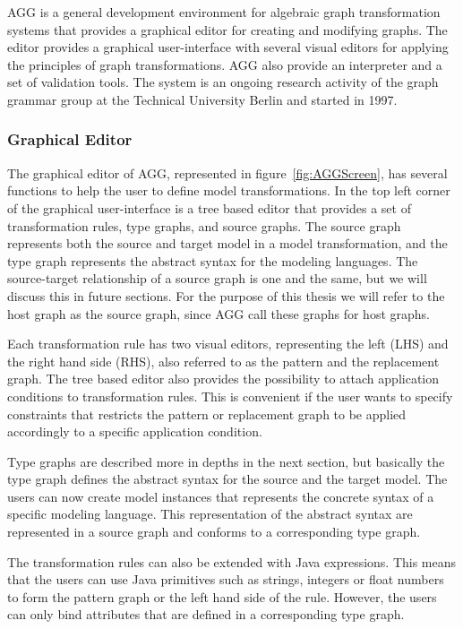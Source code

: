 AGG is a general development environment for algebraic graph
transformation systems that provides a graphical editor for creating
and modifying graphs. The editor provides a graphical user-interface with
several visual editors for applying the principles of graph transformations. AGG
also provide an interpreter and a set of validation tools. The system is an
ongoing research activity of the graph grammar group at the Technical University
Berlin and started in 1997.

\subsubsection*{Graphical Editor}
The graphical editor of AGG, represented in figure~\ref{fig:AGGScreen}, has
several functions to help the user to define model transformations. In the top
left corner of the graphical user-interface is a tree based editor that provides
a set of transformation rules, type graphs, and source graphs. The source graph
represents both the source and target model in a model transformation, and the
type graph represents the abstract syntax for the modeling languages. The
source-target relationship of a source graph is one and the same, but we will
discuss this in future sections. For the purpose of this thesis we will
refer to the host graph as the source graph, since AGG call these graphs for
host graphs.

Each transformation rule has two visual editors, representing the left
(LHS) and the right hand side (RHS), also referred to as the pattern and the
replacement graph. The tree based editor also provides the possibility to attach
application conditions to transformation rules. This is convenient if the user
wants to specify constraints that restricts the pattern or replacement graph to
be applied accordingly to a specific application condition.

Type graphs are described more in depths in the next section, but basically
the type graph defines the abstract syntax for the source and the target model.
The users can now create model instances that represents the concrete syntax of
a specific modeling language. This representation of the abstract syntax are
represented in a source graph and conforms to a corresponding type graph.

The transformation rules can also be extended with Java expressions. This means
that the users can use Java primitives such as strings, integers or float numbers to
form the pattern graph or the left hand side of the rule. However, the users
can only bind attributes that are defined in a corresponding type graph.

